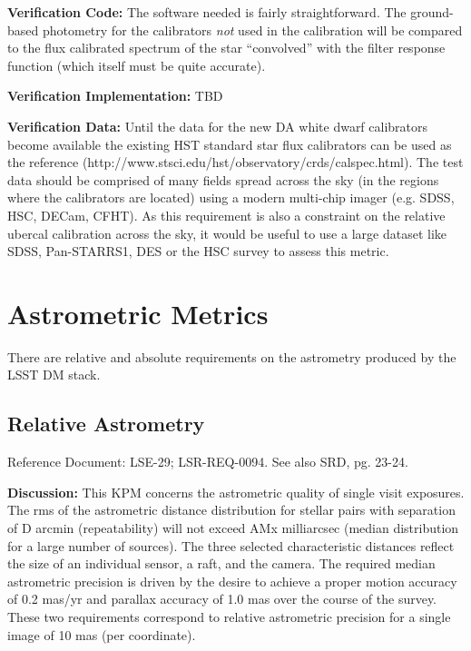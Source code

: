 \textbf{Verification Code:} The software needed is fairly
straightforward. The ground-based photometry for the calibrators
\emph{not} used in the calibration will be compared to the flux
calibrated spectrum of the star ``convolved'' with the filter response
function (which itself must be quite accurate).

\textbf{Verification Implementation:} TBD

\textbf{Verification Data:} Until the data for the new DA white dwarf
calibrators become available the existing HST standard star flux
calibrators can be used as the reference
(http://www.stsci.edu/hst/observatory/crds/calspec.html).\protect\hypertarget{_Toc301352570}{}{}
The test data should be comprised of many fields spread across the sky
(in the regions where the calibrators are located) using a modern
multi-chip imager (e.g. SDSS, HSC, DECam, CFHT). As this requirement is
also a constraint on the relative ubercal calibration across the sky, it
would be useful to use a large dataset like SDSS, Pan-STARRS1, DES or
the HSC survey to assess this metric.

\section{Astrometric Metrics}\label{astrometric-metrics}

There are relative and absolute requirements on the astrometry produced
by the LSST DM stack.

\subsection{Relative Astrometry}\label{relative-astrometry}

Reference Document: LSE-29; LSR-REQ-0094. See also SRD, pg. 23-24.

\textbf{Discussion:} This KPM concerns the astrometric quality of single
visit exposures. The rms of the astrometric distance distribution for
stellar pairs with separation of D arcmin (repeatability) will not
exceed AMx milliarcsec (median distribution for a large number of
sources). The three selected characteristic distances reflect the size
of an individual sensor, a raft, and the camera. The required median
astrometric precision is driven by the desire to achieve a proper motion
accuracy of 0.2 mas/yr and parallax accuracy of 1.0 mas over the course
of the survey. These two requirements correspond to relative astrometric
precision for a single image of 10 mas (per coordinate).

